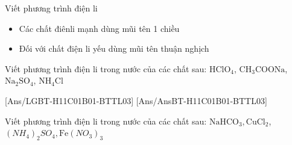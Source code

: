 \begin{dang}{Viết phương trình điện li}
\end{dang}
\begin{pp}
	\begin{itemize}
		\item Các chất điênli mạnh dùng mũi tên 1 chiều
		\item Đối với chất điện li yếu dùng mũi tên thuận nghịch
	\end{itemize}
\end{pp}
\begin{vd}
	Viết phương trình điện li trong nước của các chất sau: $\mathrm{HClO}_4$, $\mathrm{CH_3COONa}$, $\mathrm{Na}_2\mathrm{SO}_4$, $\mathrm{NH}_4\mathrm{Cl}$
\end{vd}

[Ans/LGBT-H11C01B01-BTTL03]
[Ans/AnsBT-H11C01B01-BTTL03]
\begin{bt}
	Viết phương trình điện li trong nước của các chất sau: $\mathrm{NaHCO}_3, \mathrm{CuCl}_2$, $\left(NH_4\right)_2SO_4, \mathrm{Fe}\left(NO_3\right)_3$
\end{bt}

